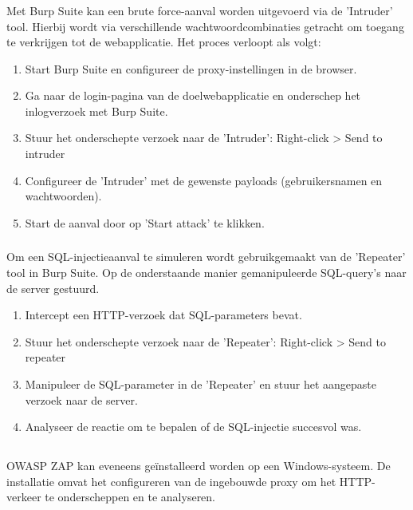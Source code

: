\subsubsection{}
Met Burp Suite kan een brute force-aanval worden uitgevoerd via de 'Intruder' tool. Hierbij wordt via verschillende wachtwoordcombinaties 
getracht om toegang te verkrijgen tot de webapplicatie. Het proces verloopt als volgt:
\begin{enumerate}
    \item Start Burp Suite en configureer de proxy-instellingen in de browser.
    \item Ga naar de login-pagina van de doelwebapplicatie en onderschep het inlogverzoek met Burp Suite.
    \item Stuur het onderschepte verzoek naar de 'Intruder': Right-click > Send to intruder
    \item Configureer de 'Intruder' met de gewenste payloads (gebruikersnamen en wachtwoorden).
    \item Start de aanval door op 'Start attack' te klikken.
\end{enumerate}

\subsubsection{}
Om een SQL-injectieaanval te simuleren wordt gebruikgemaakt van de 'Repeater' tool in Burp Suite. Op de onderstaande manier gemanipuleerde SQL-query's naar de 
server gestuurd.
\begin{enumerate}
    \item Intercept een HTTP-verzoek dat SQL-parameters bevat.
    \item Stuur het onderschepte verzoek naar de 'Repeater': Right-click > Send to repeater
    \item Manipuleer de SQL-parameter in de 'Repeater' en stuur het aangepaste verzoek naar de server.
    \item Analyseer de reactie om te bepalen of de SQL-injectie succesvol was.
\end{enumerate}

\subsection{}
OWASP ZAP kan eveneens geïnstalleerd worden op een Windows-systeem. De installatie omvat het configureren van de ingebouwde 
proxy om het HTTP-verkeer te onderscheppen en te analyseren.
